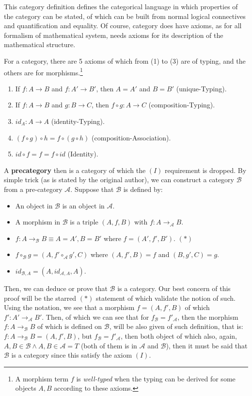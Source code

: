 This category definition defines the categorical language in which properties of the category can be stated, of which can be built from normal logical connectives and quantification and equality. Of course, category does have axioms, as for all formalism of mathematical system, needs axioms for its description of the mathematical structure. 

\begin{theorem}
For a category, there are 5 axioms of which from (1) to (3) are of typing, and the others are for morphisms.\footnote{A morphism term $f$ is \emph{well-typed} when the typing can be derived for some objects $A,B$ according to these axioms.}

\begin{enumerate}
    \item[(I)] If $f:A \to B$ and $f:A' \to B'$, then $A = A'$ and $B = B'$ \hfill (unique-Typing).
    \item[(II)] If $f:A \to B$ and $g:B \to C$, then $f \circ g : A \to C$ \hfill (composition-Typing).
    \item[(III)] $id_A : A \to A$ \hfill (identity-Typing).
    \item[(IV)] $(f \circ g) \circ h = f \circ (g \circ h)$ \hfill (composition-Association).
    \item[(V)] $id \circ f = f = f \circ id$ \hfill (Identity).
\end{enumerate}
\end{theorem}

A \textbf{precategory} then is a category of which the $(I)$ requirement is dropped. By simple trick (as is stated by the original author), we can construct a category $\mathcal{B}$ from a pre-category $\mathcal{A}$. Suppose that $\mathcal{B}$ is defined by: 
\begin{itemize}
    \item An object in $\mathcal{B}$ is an object in $\mathcal{A}$. 
    \item A morphism in $\mathcal{B}$ is a triple $(A,f,B)$ with $f:A\longrightarrow_{\mathcal{A}}B$. 
    \item $f:A\longrightarrow_{\mathcal{B}}B\equiv A=A',B=B'$ where $f=(A',f',B')$. $(*)$
    \item $f\circ_{\mathcal{B}} g=(A,f'\circ_{\mathcal{A}}g',C)$ where $(A,f',B)=f$ and $(B,g',C)=g$. 
    \item $id_{\mathcal{B},A}=(A,id_{\mathcal{A},A},A)$. 
\end{itemize}
Then, we can deduce or prove that $\mathcal{B}$ is a category. Our best concern of this proof will be the starred $(*)$ statement of which validate the notion of such. Using the notation, we see that a morphism $f=(A,f',B)$ of which $f':A'\to_{\mathcal{A}} B'$. Then, of which we can see that for $f_{\mathcal{B}}=f'_{\mathcal{A}}$, then the morphism $f:A\to_{\mathcal{B}}B$ of which is defined on $\mathcal{B}$, will be also given of such definition, that is: $f:A\to_{\mathcal{B}}B=(A,f',B)$, but $f_{\mathcal{B}}=f'_{\mathcal{A}}$, then both object of which also, again, $A,B\in \mathcal{B}\land A,B\in \mathcal{A}=T$ (both of them is in $\mathcal{A}$ and $\mathcal{B}$), then it must be said that $\mathcal{B}$ is a category since this satisfy the axiom $(I)$. 

